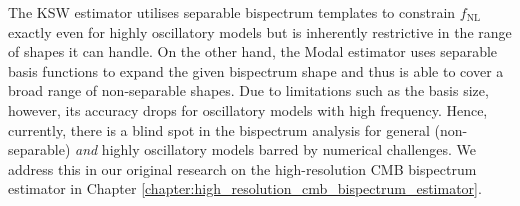 The KSW estimator utilises separable bispectrum templates to constrain $f_\text{NL}$ exactly even for highly oscillatory models but is inherently restrictive in the range of shapes it can handle. On the other hand, the Modal estimator uses separable basis functions to expand the given bispectrum shape and thus is able to cover a broad range of non-separable shapes. Due to limitations such as the basis size, however, its accuracy drops for oscillatory models with high frequency. Hence, currently, there is a blind spot in the bispectrum analysis for general (non-separable) \textit{and} highly oscillatory models barred  by numerical challenges. We address this in our original research on the high-resolution CMB bispectrum estimator in Chapter \ref{chapter:high_resolution_cmb_bispectrum_estimator}.

